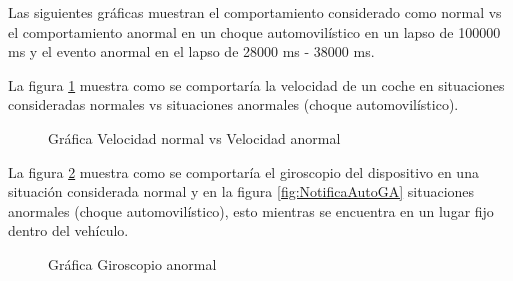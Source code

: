 Las siguientes gráficas muestran el comportamiento considerado como normal vs el comportamiento anormal en un choque automovilístico en un lapso de 100000 ms y el evento anormal en el lapso de 28000 ms - 38000 ms.

La figura \ref{fig:NotificaAutoV} muestra como se comportaría la velocidad de un coche en situaciones consideradas normales vs situaciones anormales (choque automovilístico).
\begin{figure}[htbp!]
	\centering
	\caption{Gráfica Velocidad normal vs Velocidad anormal}
	\label{fig:NotificaAutoV}
\end{figure}
La figura \ref{fig:NotificaAutoG} muestra como se comportaría el giroscopio del dispositivo en una situación considerada normal  y en la figura \ref{fig:NotificaAutoGA} situaciones anormales (choque automovilístico), esto mientras se encuentra en un lugar fijo dentro del vehículo.
\begin{figure}[htbp!]
	\centering
	\caption{Gráfica Giroscopio anormal}
	\label{fig:NotificaAutoG}
\end{figure}
